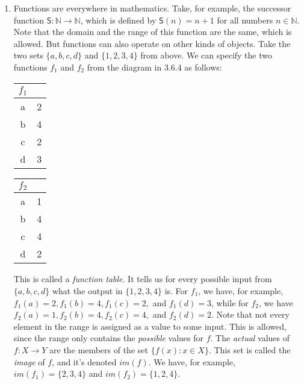 \begin{enumerate}[\thesection.1]
\item Functions are everywhere in mathematics. Take, for example, the successor function $\mathsf{S}:\mathbb{N}\to \mathbb{N}$, which is defined by $\mathsf{S}(n)=n+1$ for all numbers $n\in\mathbb{N}$. Note that the domain and the range of this function are the same, which is allowed. But functions can also operate on other kinds of objects. Take the two sets $\{a,b,c,d\}$ and $\{1,2,3,4\}$ from above. We can specify the two functions $f_1$ and $f_2$ from the diagram in 3.6.4 as follows:
	\begin{center}
		\begin{tabular}{c | c}
		$f_1$ &  \\
		\hline
		a & 2\\
		b & 4\\
		c & 2\\
		d & 3
		\end{tabular}
		\hspace{8ex}
			\begin{tabular}{c | c}
		$f_2$ &  \\
		\hline
		a & 1\\
		b & 4\\
		c & 4\\
		d & 2
		\end{tabular}
	\end{center}
    This is called a \emph{function table}.
    It tells us for every possible input from $\{a,b,c,d\}$ what the output in $\{1,2,3,4\}$ is.
    For $f_{1}$, we have, for example,
    $f_{1}(a)=2, f_{1}(b)=4, f_{1}(c)=2,$ and $f_{1}(d)=3$,
    while for $f_{2}$, we have
    $f_{2}(a)=1, f_{2}(b)=4, f_{2}(c)=4,$ and $f_{2}(d)=2$.
    Note that not every element in the range is assigned as a value to some input.
    This is allowed,
    since the range only contains the \emph{possible} values for $f$.
    The \emph{actual} values of $f:X\to Y$ are the members of the set $\{f(x): x\in X\}$.
    This set is called the \emph{image} of $f$,
    and it's denoted $im(f)$.
    We have, for example,
    $im(f_1)=\{2,3,4\}$ and $im(f_2)=\{1,2,4\}$.


\end{enumerate}
